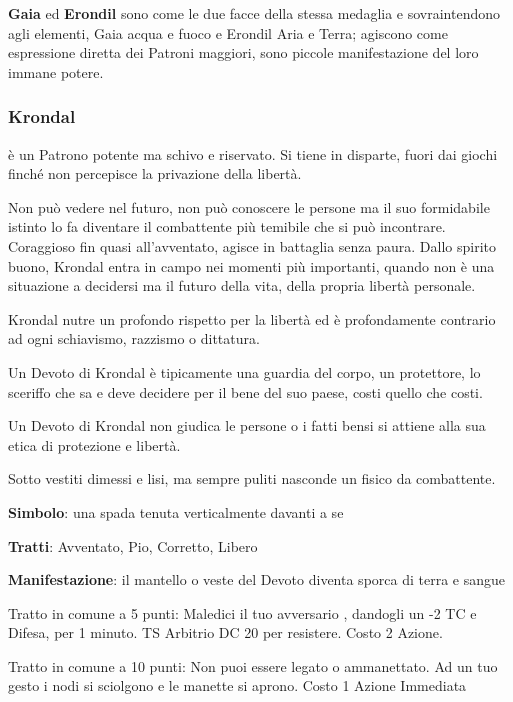 \documentclass[a4paper,11pt,twoside,openany]{book}
\begin{document}
\bigskip

\textbf{Gaia} ed \textbf{Erondil} sono come le due facce della stessa medaglia e sovraintendono agli elementi, Gaia acqua e fuoco e Erondil Aria e Terra; agiscono come espressione diretta dei Patroni maggiori, sono piccole manifestazione del loro immane potere.

\subsubsection{Krondal}

\label{krondal}

è un Patrono potente ma schivo e riservato. Si tiene in disparte, fuori dai giochi finché non percepisce la privazione della libertà.

Non può vedere nel futuro, non può conoscere le persone ma il suo formidabile istinto lo fa diventare il combattente più temibile che si può incontrare. Coraggioso fin quasi all'avventato, agisce in battaglia senza paura. Dallo spirito buono, Krondal entra in campo nei momenti più importanti, quando non è una situazione a decidersi ma il futuro della vita, della propria libertà personale.

Krondal nutre un profondo rispetto per la libertà ed è profondamente contrario ad ogni schiavismo, razzismo o dittatura.

Un Devoto di Krondal è tipicamente una guardia del corpo, un protettore, lo sceriffo che sa e deve decidere per il bene del suo paese, costi quello che costi.

Un Devoto di Krondal non giudica le persone o i fatti bensi si attiene alla sua etica di protezione e libertà.

Sotto vestiti dimessi e lisi, ma sempre puliti nasconde un fisico da combattente.

\textbf{Simbolo}: una spada tenuta verticalmente davanti a se

\textbf{Tratti}: Avventato, Pio, Corretto, Libero

\textbf{Manifestazione}: il mantello o veste del Devoto diventa sporca di terra e sangue

\bigskip

Tratto in comune a 5 punti: Maledici il tuo avversario , dandogli un -2 TC e Difesa, per 1 minuto. TS Arbitrio DC 20 per resistere. Costo 2 Azione.

Tratto in comune a 10 punti: Non puoi essere legato o ammanettato. Ad un tuo gesto i nodi si sciolgono e le manette si aprono. Costo 1 Azione Immediata
\end{document}
